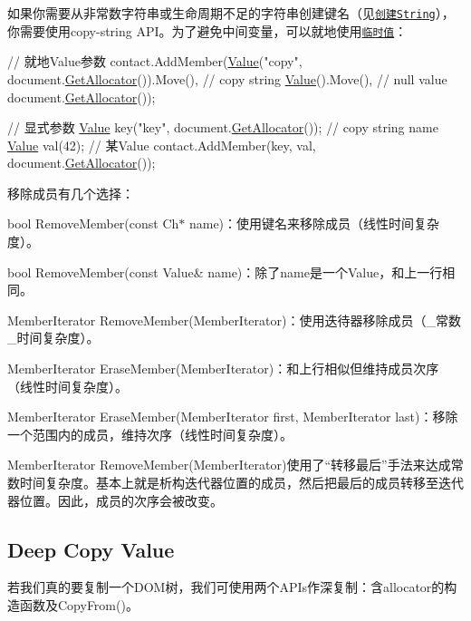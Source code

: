 如果你需要从非常数字符串或生命周期不足的字符串创建键名（见\href{#CreateString}{\tt 创建\+String}），你需要使用copy-\/string A\+P\+I。为了避免中间变量，可以就地使用\href{#TemporaryValues}{\tt 临时值}：


\begin{DoxyCode}
\textcolor{comment}{// 就地Value参数}
contact.AddMember(\hyperlink{document_8h_a071cf97155ba72ac9a1fc4ad7e63d481}{Value}(\textcolor{stringliteral}{"copy"}, document.\hyperlink{class_generic_document_aa4609d6b19f86aec1a6b96edf2c27686}{GetAllocator}()).Move(), \textcolor{comment}{// copy string}
                  \hyperlink{document_8h_a071cf97155ba72ac9a1fc4ad7e63d481}{Value}().Move(),                                \textcolor{comment}{// null value}
                  document.\hyperlink{class_generic_document_aa4609d6b19f86aec1a6b96edf2c27686}{GetAllocator}());

\textcolor{comment}{// 显式参数}
\hyperlink{class_generic_value}{Value} key(\textcolor{stringliteral}{"key"}, document.\hyperlink{class_generic_document_aa4609d6b19f86aec1a6b96edf2c27686}{GetAllocator}()); \textcolor{comment}{// copy string name}
\hyperlink{class_generic_value}{Value} val(42);                             \textcolor{comment}{// 某Value}
contact.AddMember(key, val, document.\hyperlink{class_generic_document_aa4609d6b19f86aec1a6b96edf2c27686}{GetAllocator}());
\end{DoxyCode}


移除成员有几个选择：


\begin{DoxyItemize}
\item {\ttfamily bool Remove\+Member(const Ch$\ast$ name)}：使用键名来移除成员（线性时间复杂度）。
\item {\ttfamily bool Remove\+Member(const Value\& name)}：除了{\ttfamily name}是一个\+Value，和上一行相同。
\item {\ttfamily Member\+Iterator Remove\+Member(\+Member\+Iterator)}：使用迭待器移除成员（\+\_\+常数\+\_\+时间复杂度）。
\item {\ttfamily Member\+Iterator Erase\+Member(\+Member\+Iterator)}：和上行相似但维持成员次序（线性时间复杂度）。
\item {\ttfamily Member\+Iterator Erase\+Member(\+Member\+Iterator first, Member\+Iterator last)}：移除一个范围内的成员，维持次序（线性时间复杂度）。
\end{DoxyItemize}

{\ttfamily Member\+Iterator Remove\+Member(\+Member\+Iterator)}使用了“转移最后”手法来达成常数时间复杂度。基本上就是析构迭代器位置的成员，然后把最后的成员转移至迭代器位置。因此，成员的次序会被改变。\hypertarget{md_Commun_Externe_RapidJSON_doc_tutorial.zh-cn_DeepCopyValue}{}\subsection{Deep Copy Value}\label{md_Commun_Externe_RapidJSON_doc_tutorial.zh-cn_DeepCopyValue}
若我们真的要复制一个\+D\+O\+M树，我们可使用两个\+A\+P\+Is作深复制：含allocator的构造函数及{\ttfamily Copy\+From()}。


